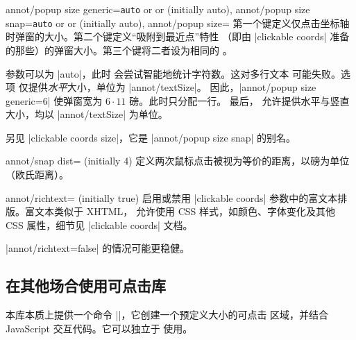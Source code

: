 \begin{pgfplotskeylist}{%
    annot/popup size generic=\texttt{auto} or  or  (initially auto),
    annot/popup size snap=\texttt{auto} or  or  (initially auto),
    annot/popup size=%
}
    第一个键定义仅点击坐标轴时弹窗的大小。第二个键定义“吸附到最近点”特性
    （即由 |clickable coords| 准备的那些）的弹窗大小。第三个键将二者设为相同的
    。

    参数可以为 |auto|，此时 \PGFPlots{} 会尝试智能地统计字符数。这对多行文本
    可能失败。选项  仅提供\emph{水平}大小，单位为 |annot/textSize|。
    因此，|annot/popup size generic=6| 使弹窗宽为 $6\cdot 11$ 磅。此时只分配一行。
    最后， 允许提供水平与竖直大小，均以 |annot/textSize| 为单位。

    另见 |clickable coords size|，它是 |annot/popup size snap| 的别名。
\end{pgfplotskeylist}

\begin{pgfplotskey}{annot/snap dist= (initially 4)}
    定义两次鼠标点击被视为等价的距离，以磅为单位（欧氏距离）。
\end{pgfplotskey}

\begin{pgfplotskey}{annot/richtext= (initially true)}
    启用或禁用 |clickable coords| 参数中的富文本排版。富文本类似于 XHTML，
    允许使用 CSS 样式，如颜色、字体变化及其他 CSS 属性，细节见 |clickable coords|
    文档。

    |annot/richtext=false| 的情况可能更稳健。
\end{pgfplotskey}


\subsection{在其他场合使用可点击库}

本库本质上提供一个命令 |\pgfplotsclickablecreate|，它创建一个预定义大小的可点击
区域，并结合 JavaScript 交互代码。它可以独立于 \PGFPlots{} 使用。

